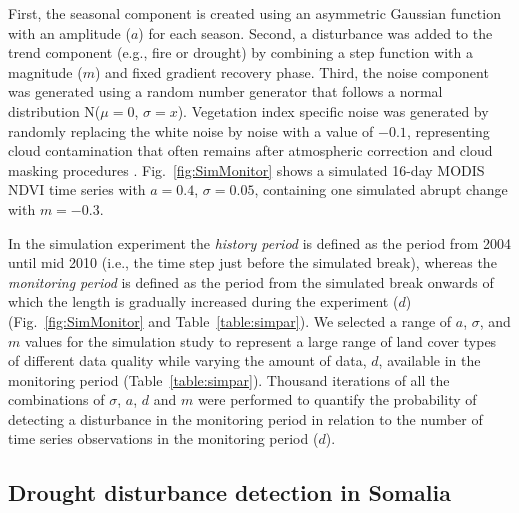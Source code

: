 \documentclass[authoryear,preprint,review,10pt]{elsarticle}
\begin{document}
First, the seasonal component is created using an asymmetric Gaussian function with an amplitude ($a$) for each season. Second, a disturbance was added to the trend component (e.g., fire or drought) by combining a step function with a magnitude ($m$) and fixed gradient recovery phase. Third, the noise component was generated using a random number generator that follows a normal distribution N($\mu = 0$, $\sigma =x$). Vegetation index specific noise was generated by randomly replacing the white noise by noise with a value of $-0.1$, representing cloud contamination that often remains after atmospheric correction and cloud masking procedures \citep[see][for more details]{Verbesselt:2010wo}. Fig.~\ref{fig:SimMonitor} shows a simulated 16-day MODIS NDVI time series with $a = 0.4$, $\sigma = 0.05$, containing one simulated abrupt change with $m = -0.3$.

In the simulation experiment the \emph{history period} is defined as the period from 2004 until mid 2010 (i.e., the time step just before the simulated break), whereas the \emph{monitoring period} is defined as the period from the simulated break onwards of which the length is gradually increased during the experiment ($d$) (Fig.~\ref{fig:SimMonitor} and Table~\ref{table:simpar}). We selected a range of $a$, $\sigma$, and $m$ values for the simulation study to represent a large range of land cover types of different data quality while varying the amount of data, $d$, available in the monitoring period (Table~\ref{table:simpar}). Thousand iterations of all the combinations of $\sigma$, $a$, $d$ and $m$ were performed to quantify the probability of detecting a disturbance in the monitoring period in relation to the number of time series observations in the monitoring period ($d$).

\subsection{Drought disturbance detection in Somalia}\label{sec:RealData}
\end{document}
